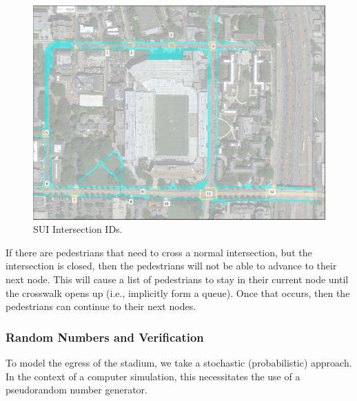 \documentclass[12pt]{article}
\begin{document}
\begin{figure}[H]
	\includegraphics[width=\linewidth,natwidth=1026,natheight=750]{GATechMap_IntersectionIDs.png}
	\caption{SUI Intersection IDs.}
	\label{fig:intersectionMap}
\end{figure}

\begin{table}[t]
	\centering
	\caption{Intersection Open/Close Timesteps}
	\label{table:intersectionTimes}
\end{table}

If there are pedestrians that need to cross a normal intersection, but the
intersection is closed, then the pedestrians will not be able to advance to
their next node. This will cause a list of pedestrians to stay in their
current node until the crosswalk opens up (i.e., implicitly form a queue).
Once that occurs, then the pedestrians can continue to their next nodes.

\subsubsection{Random Numbers and Verification}
To model the egress of the stadium, we take a stochastic (probabilistic)
approach. In the context of a computer simulation, this necessitates the use of
a pseudorandom number generator.
\end{document}
